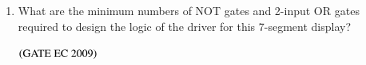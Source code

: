\documentclass[journal,12pt,onecolumn]{IEEEtran}
\theoremstyle{remark}
\begin{document}
\begin{enumerate}
\item What are the minimum numbers of NOT gates and 2-input OR gates required to design the logic of the driver for this 7-segment display?

\begin{enumerate}
\end{enumerate}
\hfill $\brak{\text{GATE EC 2009}}$
\end{enumerate}
\end{document}
